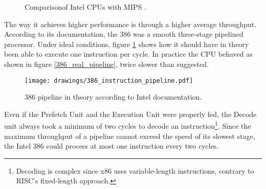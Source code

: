 \par
\begin{figure}[H]
\centering
   \caption{Comparison\protect\footnotemark of Intel CPUs with MIPS \protect\footnotemark.}
 \end{figure}

The way it achieves higher performance is through a higher average throughput. According to its documentation, the 386 was a smooth three-stage pipelined processor. Under ideal conditions, figure \ref{386_doc_pipeline} shows how it should have in theory been able to execute one instruction per cycle. In practice the CPU behaved as shown in figure \ref{386_real_pipeline}, twice slower than suggested.

\begin{figure}[H]
\centering
\texttt{[image: drawings/386\_instruction\_pipeline.pdf]}
\caption{386 pipeline in theory according to Intel documentation.}
\label{386_doc_pipeline}
\end{figure}



\par
Even if the Prefetch Unit and the Execution Unit were properly fed, the Decode unit always took a minimum of two cycles to decode an instruction\footnote{Decoding is complex since x86 uses variable-length instructions, contrary to RISC's fixed-length approach.}. Since the maximum throughput of a pipeline cannot exceed the speed of its slowest stage, the Intel 386 could process at most one instruction every two cycles.\\
\par

